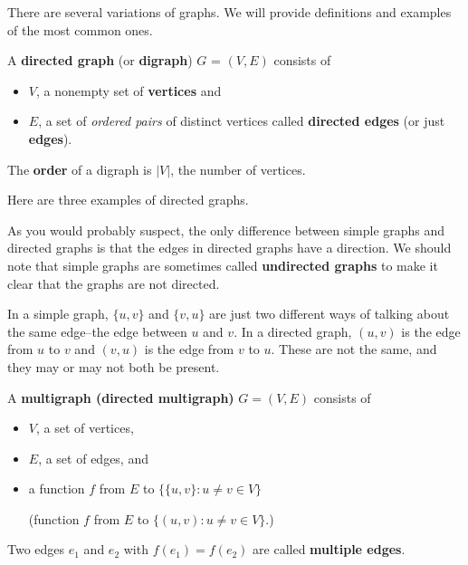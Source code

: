 There are several variations of graphs.  
We will provide definitions and examples of the most common ones.

\begin{df}
A {\bf directed graph} (or {\bf digraph}) $G$ = $(V,E)$ consists of 
\begin{itemize}
\setlength{\itemsep}{1pt}
\item 
$V$, a nonempty set of {\bf vertices} and 
\item 
$E$, a set of {\em ordered pairs} of distinct vertices called {\bf directed edges}
(or just {\bf edges}).
\end{itemize}
The {\bf order} of a digraph is $|V|$, the number of vertices.
\end{df}

\begin{exa}
Here are three examples of directed graphs.
\begin{center}
\end{center}
\end{exa}

As you would probably suspect, the only difference between simple graphs and directed graphs
is that the edges in directed graphs have a direction.
We should note that simple graphs are sometimes called {\bf undirected graphs} to make it
clear that the graphs are not directed.

\begin{exa}
In a simple graph, $\{u,v\}$ and $\{v,u\}$ are just two different ways of talking about
the same edge--the edge between $u$ and $v$.  In a directed graph, $(u,v)$ is the edge from $u$ to $v$
and $(v,u)$ is the edge from $v$ to $u$. These are not the same, and they may or may not both be present.
\end{exa}


\begin{df}
A {\bf multigraph (directed multigraph)} $G=(V,E)$ consists of 
\begin{itemize}
\item
$V$, a set of vertices,
\item
$E$, a set of edges,  and
\item
a function $f$ from $E$ to 
{\small $\{\{u,v\}:u\neq v\in V\}$}

\noindent
(function $f$ from $E$ to 
{\small $\{(u,v):u\neq v\in V\}$.)}
\end{itemize}
Two edges $e_1$ and $e_2$ with 
$f(e_1)=f(e_2)$ are called {\bf multiple edges}.
\end{df}

